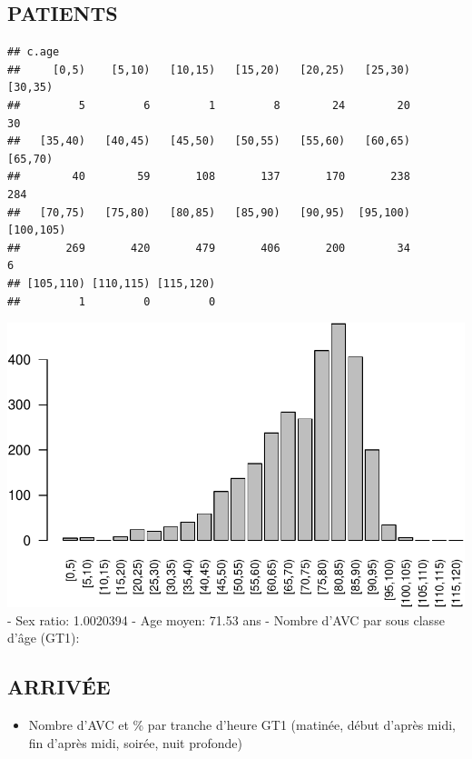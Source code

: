 \documentclass[]{article}
\begin{document}
\subsection{PATIENTS}\label{patients}

\begin{verbatim}
## c.age
##     [0,5)    [5,10)   [10,15)   [15,20)   [20,25)   [25,30)   [30,35) 
##         5         6         1         8        24        20        30 
##   [35,40)   [40,45)   [45,50)   [50,55)   [55,60)   [60,65)   [65,70) 
##        40        59       108       137       170       238       284 
##   [70,75)   [75,80)   [80,85)   [85,90)   [90,95)  [95,100) [100,105) 
##       269       420       479       406       200        34         6 
## [105,110) [110,115) [115,120) 
##         1         0         0
\end{verbatim}

\includegraphics{analyse_merge_files/figure-latex/patients-1.pdf}\\ -
Sex ratio: 1.0020394 - Age moyen: 71.53 ans - Nombre d'AVC par sous
classe d'âge (GT1):

\subsection{ARRIVÉE}\label{arrivee}

\begin{itemize}
\itemsep1pt\parskip0pt
\item
  Nombre d'AVC et \% par tranche d'heure GT1 (matinée, début d'après
  midi, fin d'après midi, soirée, nuit profonde)
\end{itemize}
\end{document}
